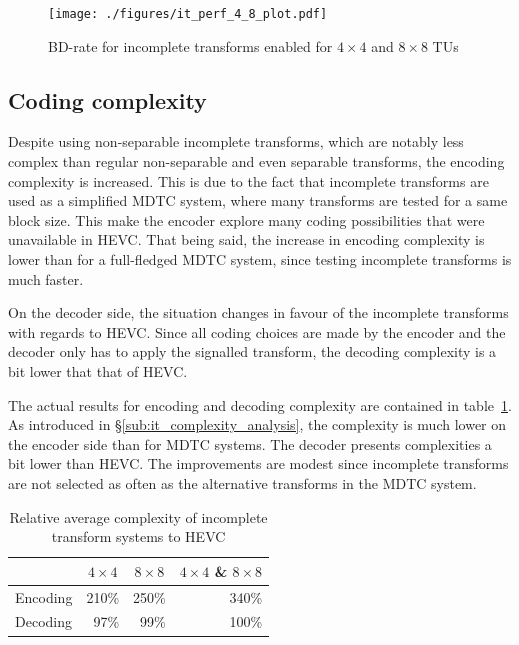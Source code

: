 \documentclass[11pt,a4paper,openright,twoside]{book}
\numberwithin{equation}{section} %
\numberwithin{figure}{section} %
\numberwithin{table}{section} %
\begin{document}
\begin{figure}[tb]
	\centering
	\texttt{[image: ./figures/it\_perf\_4\_8\_plot.pdf]}
	\caption{\acs{BD}-rate for incomplete transforms enabled for $4\times4$
	and $8\times8$ \acsp{TU}}
	\label{fig:it_perf_4_8}
\end{figure}

\subsection{Coding complexity}
\label{sub:it_coding_complexity}

Despite using non-separable incomplete transforms, which are notably less
complex than regular non-separable and even separable transforms, the encoding
complexity is increased.
This is due to the fact that incomplete transforms are used as a simplified
\ac{MDTC} system, where many transforms are tested for a same block size.
This make the encoder explore many coding possibilities that were unavailable
in \ac{HEVC}.
That being said, the increase in encoding complexity is lower than for a
full-fledged \ac{MDTC} system, since testing incomplete transforms is much
faster.

On the decoder side, the situation changes in favour of the incomplete
transforms with regards to \ac{HEVC}.
Since all coding choices are made by the encoder and the decoder only has to
apply the signalled transform, the decoding complexity is a bit lower that
that of \ac{HEVC}.

The actual results for encoding and decoding complexity are contained in
table~\ref{tab:it_complexity}.
As introduced in \S\ref{sub:it_complexity_analysis}, the complexity is much
lower on the encoder side than for \ac{MDTC} systems.
The decoder presents complexities a bit lower than \ac{HEVC}.
The improvements are modest since incomplete transforms are not selected as
often as the alternative transforms in the \ac{MDTC} system.

\begin{table}[tb]
	\centering
	\small
	\begin{tabular}{l|r|r|r}
		& \multicolumn{1}{c|}{$4\times4$}
		& \multicolumn{1}{c|}{$8\times8$}
		& \multicolumn{1}{c}{$4\times4$ \& $8\times8$} \\
		\hline\hline
		Encoding & 210\% & 250\% & 340\% \\
		Decoding &  97\% &  99\% & 100\% \\
	\end{tabular}
	\caption{Relative average complexity of incomplete transform systems to
	\acs{HEVC}}
	\label{tab:it_complexity}
\end{table}
\end{document}

